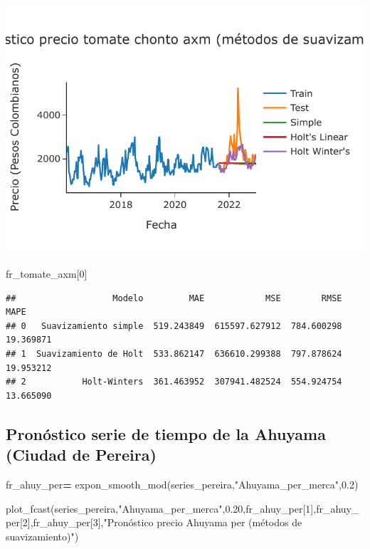 \documentclass[
]{book}
\newenvironment{Shaded}{\begin{snugshade}}{\end{snugshade}}
\newcommand{\DecValTok}[1]{\textcolor[rgb]{0.00,0.00,0.81}{#1}}
\newcommand{\FloatTok}[1]{\textcolor[rgb]{0.00,0.00,0.81}{#1}}
\newcommand{\NormalTok}[1]{#1}
\newcommand{\OperatorTok}[1]{\textcolor[rgb]{0.81,0.36,0.00}{\textbf{#1}}}
\newcommand{\StringTok}[1]{\textcolor[rgb]{0.31,0.60,0.02}{#1}}
\begin{document}
\includegraphics{bookdown-demo_files/figure-latex/unnamed-chunk-138-125.pdf}

\begin{Shaded}
\begin{Highlighting}[]

\NormalTok{fr\_tomate\_axm[}\DecValTok{0}\NormalTok{]}
\end{Highlighting}
\end{Shaded}

\begin{verbatim}
##                   Modelo         MAE            MSE        RMSE       MAPE
## 0   Suavizamiento simple  519.243849  615597.627912  784.600298  19.369871
## 1  Suavizamiento de Holt  533.862147  636610.299388  797.878624  19.953212
## 2           Holt-Winters  361.463952  307941.482524  554.924754  13.665090
\end{verbatim}

\hypertarget{pronuxf3stico-serie-de-tiempo-de-la-ahuyama-ciudad-de-pereira}{%
\subsection{Pronóstico serie de tiempo de la Ahuyama (Ciudad de Pereira)}\label{pronuxf3stico-serie-de-tiempo-de-la-ahuyama-ciudad-de-pereira}}

\begin{Shaded}
\begin{Highlighting}[]

\NormalTok{fr\_ahuy\_per}\OperatorTok{=}\NormalTok{ expon\_smooth\_mod(series\_pereira,}\StringTok{"Ahuyama\_per\_merca"}\NormalTok{,}\FloatTok{0.2}\NormalTok{)}

\NormalTok{plot\_fcast(series\_pereira,}\StringTok{"Ahuyama\_per\_merca"}\NormalTok{,}\FloatTok{0.20}\NormalTok{,fr\_ahuy\_per[}\DecValTok{1}\NormalTok{],fr\_ahuy\_per[}\DecValTok{2}\NormalTok{],fr\_ahuy\_per[}\DecValTok{3}\NormalTok{],}\StringTok{"Pronóstico precio Ahuyama per (métodos de suavizamiento)"}\NormalTok{)}
\end{Highlighting}
\end{Shaded}
\end{document}
